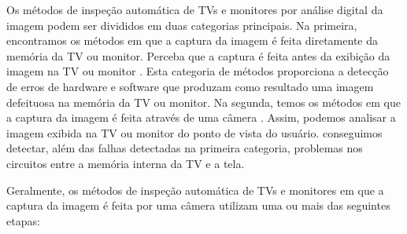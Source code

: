 

Os métodos de inspeção automática de TVs e monitores por análise digital da imagem podem ser divididos em duas categorias principais. Na primeira, encontramos os métodos em que a captura da imagem é feita diretamente da memória da TV ou monitor. Perceba que a captura é feita antes da exibição da imagem na TV ou monitor \cite{inspectimage00,inspectimage03,inspectimage04}. Esta categoria de métodos proporciona a detecção de erros de hardware e software que produzam como resultado uma imagem defeituosa na memória da TV ou monitor. Na segunda, temos os métodos em que a captura da imagem é feita através de uma câmera \cite{inspect,vantagemauto}. Assim, podemos analisar a imagem exibida na TV ou monitor do ponto de vista do usuário.
 conseguimos detectar, além das falhas detectadas na primeira categoria, problemas nos circuitos entre a memória interna da TV e a tela.

Geralmente, os métodos de inspeção automática de TVs e monitores em que a captura da imagem é feita por uma câmera utilizam uma ou mais das seguintes etapas:

